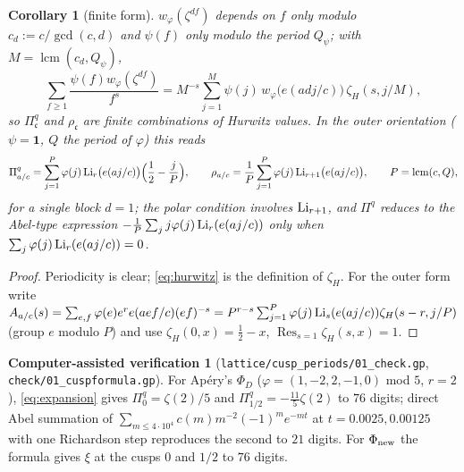 \documentclass[11pt]{amsart}
\newtheorem{corollary}[theorem]{Corollary}
\theoremstyle{definition}
\newtheorem{verification}[theorem]{Computer-assisted verification}
\theoremstyle{remark}
\DeclareMathOperator{\lcmop}{lcm}\DeclareMathOperator{\ord}{ord}\DeclareMathOperator{\Res}{Res}\DeclareMathOperator{\Gal}{Gal}
\newcommand{\cc}{\mathfrak c}\newcommand{\Pc}{\Pi_{\cc}}\newcommand{\Pq}{\Pi^{q}}
\newcommand{\Phinew}{\Phi_{\rm new}}\newcommand{\Phican}{\Phi_{\rm can}}
\begin{document}
\begin{corollary}[finite form]\label{cor:finite}
$w_\varphi(\zeta^{df})$ depends on $f$ only modulo $c_d:=c/\gcd(c,d)$ and $\psi(f)$ only modulo the period $Q_\psi$; with $M=\lcmop(c_d,Q_\psi)$,
\begin{equation}\label{eq:hurwitz}
\sum_{f\ge1}\frac{\psi(f)w_\varphi(\zeta^{df})}{f^{s}}=M^{-s}\sum_{j=1}^{M}\psi(j)\,w_\varphi\bigl(e(adj/c)\bigr)\,\zeta_H(s,j/M),
\end{equation}
so $\Pq_{\cc}$ and $\rho_{\cc}$ are finite combinations of Hurwitz values. In the outer orientation ($\psi=\mathbf 1$, $Q$ the period of $\varphi$) this reads
$$\Pq_{a/c}=\sum_{j=1}^{P}\varphi(j)\Li_r\bigl(e(aj/c)\bigr)\Bigl(\frac12-\frac jP\Bigr),\qquad \rho_{a/c}=\frac1P\sum_{j=1}^{P}\varphi(j)\Li_{r+1}\bigl(e(aj/c)\bigr),\qquad P=\lcmop(c,Q),$$
for a single block $d=1$; the polar condition involves $\operatorname{Li}_{r+1}$, and $\Pq$ reduces to the Abel-type expression $-\frac1P\sum_jj\varphi(j)\operatorname{Li}_r(e(aj/c))$ only when $\sum_j\varphi(j)\operatorname{Li}_r(e(aj/c))=0$.
\end{corollary}
\begin{proof}
Periodicity is clear; \eqref{eq:hurwitz} is the definition of $\zeta_H$. For the outer form write $A_{a/c}(s)=\sum_{e,f}\varphi(e)e^{r}e(aef/c)(ef)^{-s}=P^{r-s}\sum_{j=1}^P\varphi(j)\operatorname{Li}_s(e(aj/c))\zeta_H(s-r,j/P)$ (group $e$ modulo $P$) and use $\zeta_H(0,x)=\tfrac12-x$, $\Res_{s=1}\zeta_H(s,x)=1$.
\end{proof}

\begin{verification}[\texttt{lattice/cusp\_periods/01\_check.gp}, \texttt{check/01\_cuspformula.gp}]
For Ap\'ery's $\Phi_D$ ($\varphi=(1,-2,2,-1,0)$ mod $5$, $r=2$), \eqref{eq:expansion} gives $\Pq_0=\zeta(2)/5$ and $\Pq_{1/2}=-\tfrac{11}5\zeta(2)$ to $76$ digits; direct Abel summation of $\sum_{m\le4\cdot10^4}c(m)m^{-2}(-1)^me^{-mt}$ at $t=0.0025,0.00125$ with one Richardson step reproduces the second to $21$ digits. For $\Phinew$ the formula gives $\xi$ at the cusps $0$ and $1/2$ to $76$ digits.
\end{verification}
\end{document}
